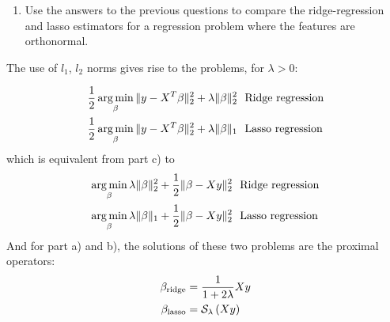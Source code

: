 \documentclass[12pt,twoside]{article}
\begin{document}
\begin{enumerate}
\begin{enumerate}
\item Use the answers to the previous questions to compare the ridge-regression and lasso estimators for a regression problem where the features are orthonormal.
  \end{enumerate}
The use of $l_1$, $l_2$ norms gives rise to the problems, for $\lambda > 0$:

\begin{align*}
\frac{1}{2} \operatorname*{arg\,min}_\beta \| y - X^T \beta\|_2^2 + \lambda \|\beta\|_2^2	& \text{~ Ridge regression} \\
\frac{1}{2} \operatorname*{arg\,min}_\beta \| y - X^T \beta\|_2^2 + \lambda \|\beta\|_1	& \text{~ Lasso regression}
\end{align*} 
which is equivalent from part c) to
\begin{align*}
 \operatorname*{arg\,min}_\beta  \lambda \|\beta\|_2^2 + \frac{1}{2} \| \beta - X y \|_2^2 	& \text{~ Ridge regression} \\
 \operatorname*{arg\,min}_\beta   \lambda \|\beta\|_1+    \frac{1}{2} \| \beta - X y \|_2^2 	& \text{~ Lasso regression}
\end{align*} 
And for part a) and b), the solutions of these two problems are the proximal operators:
\begin{align*}
	\beta_{\text{ridge}}	&= 	 \frac{1} {1+2 \lambda} X y \\
	\beta_{\text{lasso}}	&= 	  \mathcal{ S }_{\lambda}\left( X y \right)\\
\end{align*} 


\end{enumerate}
\end{document}
